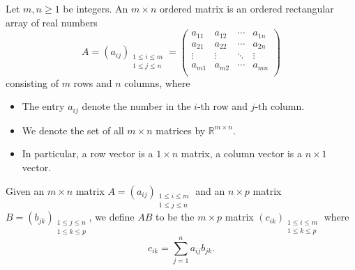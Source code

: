 \begin{definition}
    Let \(m, n \ge 1\) be integers. An \(m \times n\) ordered matrix is an ordered rectangular array of real numbers 
    \[
        A = (a_{ij})_{\substack{1 \le i \le m \\ 1 \le j \le n}} = \begin{pmatrix}
            a_{11} & a_{12} & \cdots & a_{1n}  \\
            a_{21} & a_{22} & \cdots & a_{2n}  \\
            \vdots & \vdots & \ddots &  \vdots \\
            a_{m1} & a_{m2}  & \cdots & a_{mn}  \\
        \end{pmatrix}
    \]  
    consisting of \(m\) rows and \(n\) columns, where 
    \begin{itemize}
        \item [(a)] The entry \(a_{ij}\) denote the number in the \(i\)-th row and \(j\)-th column. 
        \item [(b)] We denote the set of all \(m \times n\) matrices by \(\mathbb{R} ^{m \times n}\). 
        \item [(c)] In particular, a row vector is a \(1 \times n\) matrix, a column vector is a \(n \times 1\) vector.       
    \end{itemize}
\end{definition}

\begin{definition}
    Given an \(m \times n\) matrix \(A = (a_{ij})_{\substack{1 \le i \le m \\ 1 \le j \le n}}\) and an \(n \times p\) matrix \(B = (b_{jk})_{\substack{1 \le j \le n \\ 1 \le k \le p}}\), we define \(AB\) to be the \(m \times p\) matrix \((c_{ik})_{\substack{1 \le i \le m \\ 1 \le k \le p}}\) where 
    \[
        c_{ik} = \sum_{j=1}^n a_{ij} b_{jk}. 
    \]    
\end{definition}

